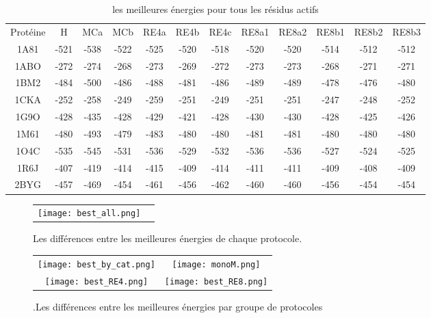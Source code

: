     \begin{table}[h]
      \centering

      \begin{tabular}{cccccccccccc}


        \toprule
        Protéine & H & MCa & MCb & RE4a & RE4b & RE4c & RE8a1 & RE8a2 & RE8b1 & RE8b2 & RE8b3 \\
        \cmidrule{1-12}
        1A81 & -521 & -538 & -522 & -525 & -520 & -518 & -520 & -520 & -514 & -512 & -512 \\
        1ABO & -272 & -274 & -268 & -273 & -269 & -272 & -273 & -273 & -268 & -271 & -271 \\
        1BM2 & -484 & -500 & -486 & -488 & -481 & -486 & -489 & -489 & -478 & -476 & -480 \\
        1CKA & -252 & -258 & -249 & -259 & -251 & -249 & -251 & -251 & -247 & -248 & -252 \\
        1G9O & -428 & -435 & -428 & -429 & -421 & -428 & -430 & -430 & -428 & -425 & -426 \\
        1M61 & -480 & -493 & -479 & -483 & -480 & -480 & -481 & -481 & -480 & -480 & -480 \\
        1O4C & -535 & -545 & -531 & -536 & -529 & -532 & -536 & -536 & -527 & -524 & -525 \\
        1R6J & -407 & -419 & -414 & -415 & -409 & -414 & -411 & -411 & -409 & -408 & -409 \\
        2BYG & -457 & -469 & -454 & -461 & -456 & -462 & -460 & -460 & -456 & -454 & -454 \\
        
        \bottomrule


      \end{tabular}      
      \caption{les meilleures énergies pour tous les résidus actifs}
\label{tab:best_ener_all_all}      
    \end{table}


   \begin{figure}[t]
     \centering
     \begin{tabular}{cc}
       \texttt{[image: best\_all.png]} \\
     \end{tabular}
     \caption{Les différences entre les meilleures énergies de chaque protocole.}
\label{graph:best_ener_all_all}
   \end{figure}


    \clearpage


   \begin{figure}[t]
     \centering
     \begin{tabular}{cc}
       \texttt{[image: best\_by\_cat.png]} &
       \texttt{[image: monoM.png]} \\
       \texttt{[image: best\_RE4.png]} &
       \texttt{[image: best\_RE8.png]} \\
     \end{tabular}
     \caption{.Les différences entre les meilleures énergies par groupe de protocoles}
\label{graph:best_ener_by_algo}
   \end{figure}


